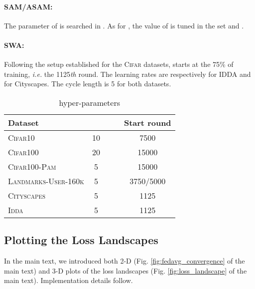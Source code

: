 \paragraph{SAM/ASAM:} The parameter  of \sam is searched in . As for \asam, the value of  is tuned in the set  and .

\paragraph{SWA:} Following the setup established for the \textsc{Cifar} datasets, \swa starts at the 75\% of training, \textit{i.e.} the 1125\textit{th} round. The learning rates  are respectively  for IDDA and  for Cityscapes. The cycle length is 5 for both datasets.

\begin{table}[t]\centering
\caption{\swa hyper-parameters}\label{tab:params_swa}
\scriptsize
\setlength\tabcolsep{0.25cm}
    \begin{tabular}{lcccc}
    \toprule
    Dataset &  &  &  & Start round\\
    \midrule
    \textsc{Cifar10} & 10 &  &  & 7500\\
    \textsc{Cifar100} & 20 &  &  & 15000\\
    \textsc{Cifar100-Pam} & 5 &  &  & 15000\\
    \textsc{Landmarks-User-160k} & 5 &  &  & 3750/5000\\
    \textsc{Cityscapes} & 5&&  & 1125\\
    \textsc{Idda} &5&  && 1125\\
    \bottomrule
    \end{tabular}
\end{table}

\subsection{Plotting the Loss Landscapes}
In the main text, we introduced both 2-D (Fig. \ref{fig:fedavg_convergence} of the main text) and 3-D plots of the loss landscapes (Fig. \ref{fig:loss_landscape} of the main text). Implementation details follow.

